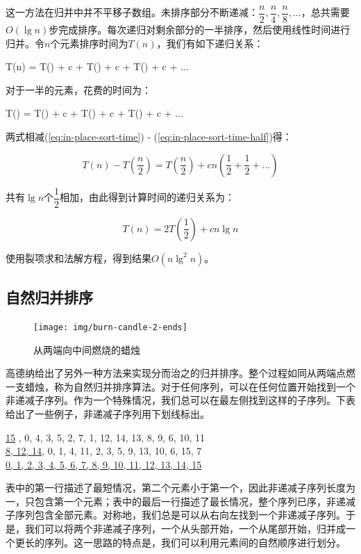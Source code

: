 \documentclass[b5paper]{ctexart}
\begin{document}
这一方法在归并中并不平移子数组。未排序部分不断递减：$\dfrac{n}{2}, \dfrac{n}{4}, \dfrac{n}{8}, ...$，总共需要$O(\lg n)$步完成排序。每次递归对剩余部分的一半排序，然后使用线性时间进行归并。令$n$个元素排序时间为$T(n)$，我们有如下递归关系：

\be
T(n) = T() + c  + T() + c  + T() + c  + ...
\label{eq:in-place-sort-time}
\ee

对于一半的元素，花费的时间为：

\be
T() = T() + c  + T() + c  + T() + c  + ...
\label{eq:in-place-sort-time-half}
\ee

两式相减(\ref{eq:in-place-sort-time}) - (\ref{eq:in-place-sort-time-half})得：

\[
T(n) - T(\frac{n}{2}) = T(\frac{n}{2}) + c n (\frac{1}{2} + \frac{1}{2} + ... )
\]

共有$\lg n$个$\dfrac{1}{2}$相加，由此得到计算时间的递归关系为：

\[
T(n) = 2 T(\frac{1}{2}) + c n \lg n
\]

使用裂项求和法解方程，得到结果$O(n \lg^2 n)$。

\subsection{自然归并排序}

\begin{figure}[htbp]
 \centering
 \texttt{[image: img/burn-candle-2-ends]}
 \caption{从两端向中间燃烧的蜡烛}
 \label{fig:burn-candle}
\end{figure}

高德纳给出了另外一种方法来实现分而治之的归并排序。整个过程如同从两端点燃一支蜡烛\cite{TAOCP}，称为自然归并排序算法。对于任何序列，可以在任何位置开始找到一个非递减子序列。作为一个特殊情况，我们总可以在最左侧找到这样的子序列。下表给出了一些例子，非递减子序列用下划线标出。

\hline
\underline{15} , 0, 4, 3, 5, 2, 7, 1, 12, 14, 13, 8, 9, 6, 10, 11 \\
\underline{8, 12, 14}, 0, 1, 4, 11, 2, 3, 5, 9, 13, 10, 6, 15, 7 \\
\underline{0, 1, 2, 3, 4, 5, 6, 7, 8, 9, 10, 11, 12, 13, 14, 15} \\
\hline
\etab

表中的第一行描述了最短情况，第二个元素小于第一个，因此非递减子序列长度为一，只包含第一个元素；表中的最后一行描述了最长情况，整个序列已序，非递减子序列包含全部元素。对称地，我们总是可以从右向左找到一个非递减子序列。于是，我们可以将两个非递减子序列，一个从头部开始，一个从尾部开始，归并成一个更长的序列。这一思路的特点是，我们可以利用元素间的自然顺序进行划分。
\end{document}
